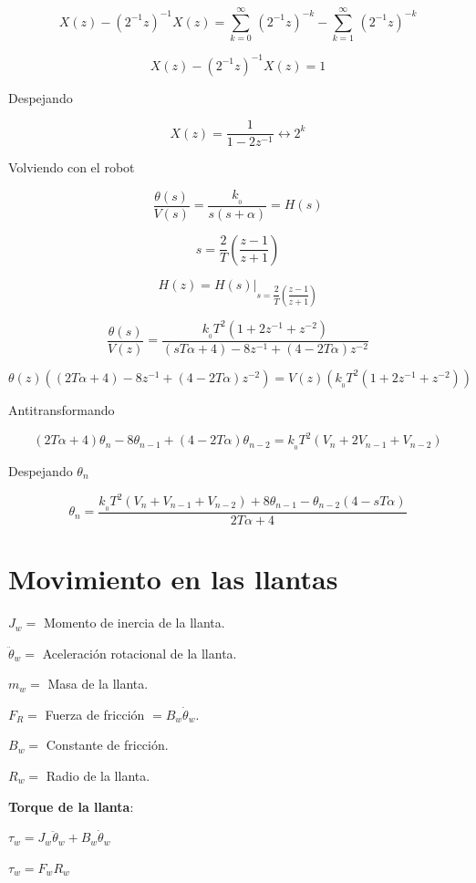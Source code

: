 $$X(z) - (2^{-1}z)^{-1}X(z) = \sum_{k = 0}^{\infty}\, (2^{-1}z)^{-k} - \sum_{k = 1}^{\infty}\, (2^{-1}z)^{-k}$$

$$X(z) - (2^{-1}z)^{-1}X(z)  =  1$$

Despejando

$$X(z) = \dfrac{1}{1 - 2z^{-1}} \leftrightarrow 2^{k}$$

Volviendo con el robot

$$\dfrac{\theta(s)}{V(s)} = \dfrac{k_{_0}}{s(s + \alpha)} = H(s)$$

$$s = \dfrac{2}{T}\left( \dfrac{z - 1}{z + 1} \right)$$ 

$$H(z) = \left. H(s)\right|_{s = \dfrac{2}{T}\left( \dfrac{z - 1}{z + 1} \right)}$$

$$\dfrac{\theta(s)}{V(z)} = \dfrac{k_{_0}T^{2}(1 + 2z^{-1} + z^{-2})}{(sT\alpha + 4) - 8z^{-1} + (4 - 2T\alpha)z^{-2}}$$
	
$$\theta(z)\left( (2T\alpha + 4) - 8z^{-1} + (4 - 2T\alpha)z^{-2} \right) = V(z)\left( k_{_0}T^{2}(1 + 2z^{-1} + z^{-2}) \right)$$	

Antitransformando

$$(2T\alpha + 4)\theta_{n} - 8\theta_{n - 1} + (4 - 2T\alpha)\theta_{n - 2} = k_{_0}T^{2}(V_{n} + 2V_{n - 1} + V_{n - 2})$$ 

Despejando $\theta_{n}$

$$\theta_{n} = \dfrac{k_{_0}T^{2}(V_{n} + V_{n - 1} + V_{n - 2}) + 8\theta_{n - 1} - \theta_{n - 2}(4 - sT\alpha)}{2T\alpha + 4}$$


\section{Movimiento en las llantas}


$J_{w} = $ Momento de inercia de la llanta.

$\ddot{\theta}_{w} = $ Aceleración rotacional de la llanta.

$m_{w} = $ Masa de la llanta.

$F_{R} = $ Fuerza de fricción $= B_{w} \dot{\theta}_{w}$.

$B_{w} = $ Constante de fricción.

$R_{w} = $ Radio de la llanta.



\textbf{Torque de la llanta}:


$\tau_{w} = J_{w}\ddot{\theta}_{w} + B_{w}\dot{\theta}_{w}$

$\tau_{w} = F_{w}R_{w}$

